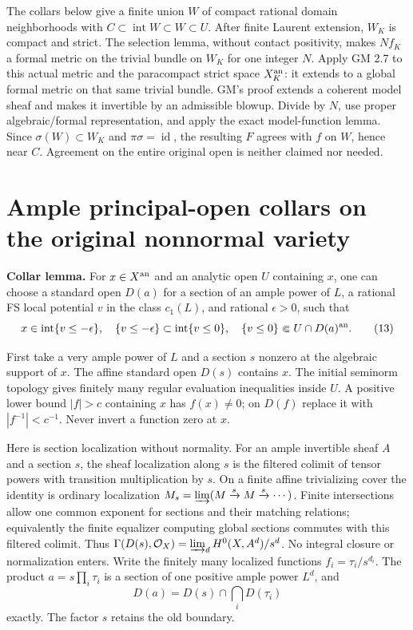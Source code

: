 \documentclass[
  11pt,
]{article}
\begin{document}
The collars below give a finite union \(W\) of compact rational domain
neighborhoods with \(C\subset\operatorname{int}W\subset W\subset U\).
After finite Laurent extension, \(W_K\) is compact and strict. The
selection lemma, without contact positivity, makes \(Nf_K\) a formal
metric on the trivial bundle on \(W_K\) for one integer \(N\). Apply GM
2.7 to this actual metric and the paracompact strict space
\(X_K^{\rm an}\): it extends to a global formal metric on that same
trivial bundle. GM's proof extends a coherent model sheaf and makes it
invertible by an admissible blowup. Divide by \(N\), use proper
algebraic/formal representation, and apply the exact model-function
lemma. Since \(\sigma(W)\subset W_K\) and
\(\pi\sigma=\operatorname{id}\), the resulting \(F\) agrees with \(f\)
on \(W\), hence near \(C\). Agreement on the entire original open is
neither claimed nor needed.

\section{Ample principal-open collars on the original nonnormal
variety}\label{ample-principal-open-collars-on-the-original-nonnormal-variety}

\textbf{Collar lemma.} For \(x\in X^{\rm an}\) and an analytic open
\(U\) containing \(x\), one can choose a standard open \(D(a)\) for a
section of an ample power of \(L\), a rational FS local potential \(v\)
in the class \(c_1(L)\), and rational \(\epsilon>0\), such that
\[x\in\operatorname{int}\{v\le-\epsilon\},\quad
 \{v\le-\epsilon\}\subset\operatorname{int}\{v\le0\},\quad
 \{v\le0\}\Subset U\cap D(a)^{\rm an}. \tag{13}\]

First take a very ample power of \(L\) and a section \(s\) nonzero at
the algebraic support of \(x\). The affine standard open \(D(s)\)
contains \(x\). The initial seminorm topology gives finitely many
regular evaluation inequalities inside \(U\). A positive lower bound
\(|f|>c\) containing \(x\) has \(f(x)\ne0\); on \(D(f)\) replace it with
\(|f^{-1}|<c^{-1}\). Never invert a function zero at \(x\).

Here is section localization without normality. For an ample invertible
sheaf \(A\) and a section \(s\), the sheaf localization along \(s\) is
the filtered colimit of tensor powers with transition multiplication by
\(s\). On a finite affine trivializing cover the identity is ordinary
localization \(M_s=\varinjlim(M\xrightarrow{s}M\xrightarrow{s}\cdots)\).
Finite intersections allow one common exponent for sections and their
matching relations; equivalently the finite equalizer computing global
sections commutes with this filtered colimit. Thus
\(\Gamma(D(s),\mathcal O_X)=\varinjlim_d H^0(X,A^d)/s^d\). No integral
closure or normalization enters. Write the finitely many localized
functions \(f_i=\tau_i/s^{d_i}\). The product \(a=s\prod_i\tau_i\) is a
section of one positive ample power \(L^d\), and
\[D(a)=D(s)\cap\bigcap_iD(\tau_i)\] exactly. The factor \(s\) retains
the old boundary.
\end{document}
